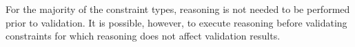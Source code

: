 \documentclass{llncs}
\newcommand{\ms}[1]{\texttt{#1}}
\newenvironment{DL}{
  \vspace{0cm}
  \begin{tabular}{r l}

}{
  \end{tabular}
}
\begin{document}
For the majority of the constraint types, reasoning is not needed to be performed prior to validation. 
It is possible, however, to execute reasoning before validating constraints for which reasoning does not affect validation results.
%
%
%
\end{document}
